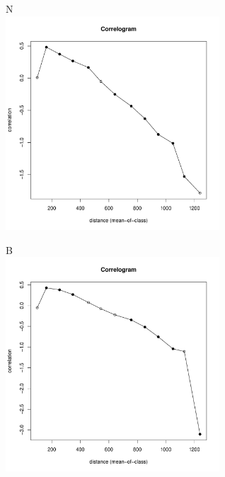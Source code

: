 	\begin{figure}[h]

	\begin{minipage}[b]{.5\linewidth}
	\begin{center}
	{\small N}\\
		\includegraphics[width=80mm]{../Barenc_Sea/distribution_Moran/Pala_moran_N_Macoma_balthica_.pdf}
	\end{center}
	\end{minipage}
	\hfil %
	\begin{minipage}[b]{.5\linewidth}
	\begin{center}
	{\small B}\\
		\includegraphics[width=80mm]{../Barenc_Sea/distribution_Moran/Pala_moran_B_Macoma_balthica_.pdf}
	\end{center}
	\end{minipage}


\end{figure}
